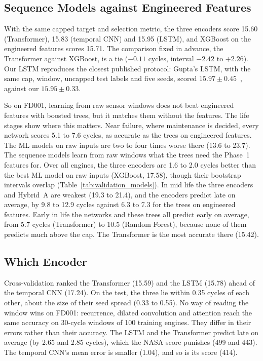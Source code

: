 \subsection{Sequence Models against Engineered Features}
With the same capped target and selection metric, the three encoders score
15.60 (Transformer), 15.83 (temporal CNN) and 15.95 (LSTM), and XGBoost on
the engineered features scores 15.71. The comparison fixed in advance, the
Transformer against XGBoost, is a tie ($-0.11$ cycles, interval $-2.42$ to
$+2.26$). Our LSTM reproduces the closest published protocol: Gupta's LSTM,
with the same cap, window, uncapped test labels and five seeds, scored
$15.97\pm0.45$~\cite{Gupta2026auditing}, against our $15.95\pm0.33$.

So on FD001, learning from raw sensor windows does not beat engineered
features with boosted trees, but it matches them without the features. The
life stages show where this matters. Near failure, where maintenance is
decided, every network scores 5.1 to 7.6 cycles, as accurate as the trees on
engineered features. The ML models on raw inputs are two to four times worse
there (13.6 to 23.7). The sequence models learn from raw windows what the trees
need the Phase~1 features for. Over all engines, the three encoders are 1.6 to
2.0 cycles better than the best ML model on raw inputs (XGBoost, 17.58),
though their bootstrap intervals overlap (Table~\ref{tab:validation_models}).
In mid life the three encoders and Hybrid~A are weakest (19.3 to 21.4), and the
encoders predict late on average, by 9.8 to 12.9 cycles against 6.3 to 7.3 for
the trees on engineered features. Early in life the networks and these trees
all predict early on average, from 5.7 cycles (Transformer) to 10.5 (Random
Forest), because none of them predicts much above the cap. The Transformer is the most accurate there
(15.42).

\subsection{Which Encoder}
Cross-validation ranked the Transformer (15.59) and the LSTM (15.78) ahead of
the temporal CNN (17.24). On the test, the three lie within 0.35 cycles of
each other, about the size of their seed spread (0.33 to 0.55). No way of
reading the window wins on FD001: recurrence, dilated convolution and attention reach the
same accuracy on 30-cycle windows of 100 training engines. They differ in
their errors rather than their accuracy. The LSTM and the Transformer predict
late on average (by 2.65 and 2.85 cycles), which the NASA score punishes
(499 and 443). The temporal CNN's mean error is smaller (1.04), and so is its
score (414).

